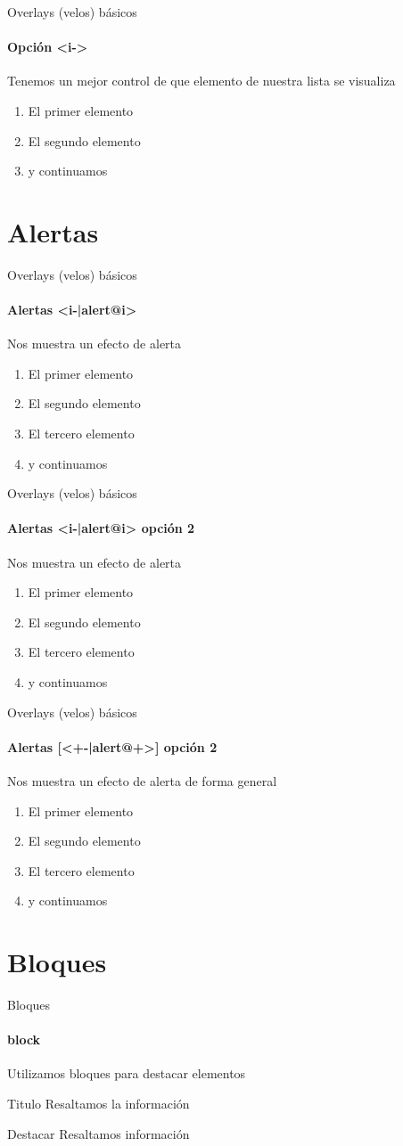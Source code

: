 \documentclass{beamer}
\begin{document}
\begin{frame}{Overlays (velos) básicos}
\framesubtitle{Opción <i->}
Tenemos un mejor control de que elemento de nuestra lista se visualiza
\begin{enumerate}
\item<1-> El primer elemento
\item<1-> El segundo elemento
\item<2-> y continuamos
\end{enumerate}
\end{frame}

\section{Alertas}
\begin{frame}{Overlays (velos) básicos}
\framesubtitle{Alertas <i-|alert@i>}
Nos muestra un efecto de alerta
\begin{enumerate}
\item<1-|alert@1> El primer elemento
\item<2-|alert@2> El segundo elemento
\item<3-|alert@3> El tercero elemento
\item<4-|alert@4> y continuamos
\end{enumerate}
\end{frame}

\begin{frame}{Overlays (velos) básicos}
\framesubtitle{Alertas <i-|alert@i> opción 2}
Nos muestra un efecto de alerta
\begin{enumerate}
\item<1-|alert@1> El primer elemento
\item<2-|alert@2> El segundo elemento
\item<1-|alert@1> El tercero elemento
\item<3-|alert@3> y continuamos
\end{enumerate}
\end{frame}

\begin{frame}{Overlays (velos) básicos}
\framesubtitle{Alertas [<+-|alert@+>] opción 2}
Nos muestra un efecto de alerta de forma general
\begin{enumerate}[<+-|alert@+>]
\item El primer elemento
\item El segundo elemento
\item El tercero elemento
\item y continuamos
\end{enumerate}
\end{frame}

\section{Bloques}
\begin{frame}{Bloques}
\framesubtitle{block}
Utilizamos bloques para destacar elementos

\begin{block}{Titulo}
Resaltamos la información
\end{block}
\pause
\begin{alertblock}{Destacar}
Resaltamos información
\end{alertblock}

\end{frame}
\end{document}
